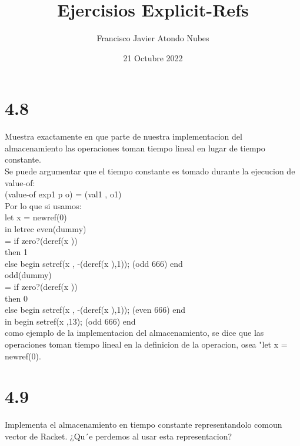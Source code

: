 \documentclass{article}
\title{Ejercisios Explicit-Refs}
\author{Francisco Javier Atondo Nubes }
\date{21 Octubre 2022}
\begin{document}
\maketitle

\section{4.8}
\noindent Muestra exactamente en que parte de nuestra implementacion del almacenamiento las operaciones toman tiempo lineal en lugar de tiempo constante.\\

\noindent Se puede argumentar que el tiempo constante es tomado durante la ejecucion de value-of:\\
\hspace{5mm} (value-of exp1 p o) = (val1 , o1)\\

Por lo que si usamos:\\
let x = newref(0)\\
in letrec even(dummy)\\
\hspace{1mm} = if zero?(deref(x ))\\
\hspace{2mm} then 1\\
\hspace{2mm} else begin setref(x , -(deref(x ),1)); (odd 666) end\\
\hspace{1mm} odd(dummy)\\
\hspace{1mm} = if zero?(deref(x ))\\
\hspace{2mm} then 0\\
\hspace{2mm} else begin setref(x , -(deref(x ),1)); (even 666) end\\
\hspace{1mm} in begin setref(x ,13); (odd 666) end\\

\noindent como ejemplo de la implementacion del almacenamiento, se dice que las operaciones toman tiempo lineal en la definicion de la operacion, osea "let x = newref(0).\\

\section{4.9}
Implementa el almacenamiento en tiempo constante representandolo comoun vector de Racket. ¿Qu´e perdemos al usar esta representacion?
\end{document}
